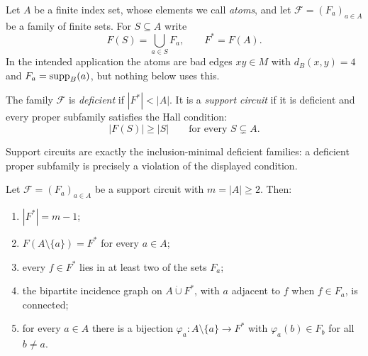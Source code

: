 Let \(A\) be a finite index set, whose elements we call \emph{atoms},
and let \(\mathcal F=(F_a)_{a\in A}\) be a family of finite sets. For
\(S\subseteq A\) write
\[
 F(S)=\bigcup_{a\in S}F_a,
 \qquad
 F^{*}=F(A).
\]
In the intended application the atoms are bad edges \(xy\in M\) with
\(d_B(x,y)=4\) and \(F_a=\operatorname{supp}_B(a)\), but nothing below uses this.

\begin{definition}\label{def:circuit}
The family \(\mathcal F\) is \emph{deficient} if \(|F^{*}|<|A|\). It is
a \emph{support circuit} if it is deficient and every proper subfamily
satisfies the Hall condition:
\[
 |F(S)|\ge|S|
 \qquad\text{for every } S\subsetneq A.
\]
\end{definition}

Support circuits are exactly the inclusion-minimal deficient families:
a deficient proper subfamily is precisely a violation of the displayed
condition.

\begin{theorem}\label{thm:circuit}
Let \(\mathcal F=(F_a)_{a\in A}\) be a support circuit with
\(m=|A|\ge2\). Then:
\begin{enumerate}[label=\textup{(\roman*)}]
\item \(|F^{*}|=m-1\);
\item \(F(A\setminus\{a\})=F^{*}\) for every \(a\in A\);
\item every \(f\in F^{*}\) lies in at least two of the sets \(F_a\);
\item the bipartite incidence graph on \(A\mathbin{\dot\cup}F^{*}\),
with \(a\) adjacent to \(f\) when \(f\in F_a\), is connected;
\item for every \(a\in A\) there is a bijection
\(\varphi_a\colon A\setminus\{a\}\to F^{*}\) with
\(\varphi_a(b)\in F_b\) for all \(b\neq a\).
\end{enumerate}
\end{theorem}

